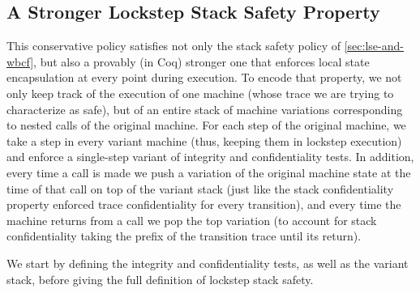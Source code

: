 \documentclass[acmsmall,review,anonymous]{acmart}\settopmatter{printfolios=true,printccs=false,printacmref=false}
\begin{document}
{%


\subsection{A Stronger Lockstep Stack Safety Property}
\label{sec:lockstep}


This conservative policy satisfies not only the stack safety policy of
\cref{sec:lse-and-wbcf},
but also a provably (in Coq) stronger one that enforces local state
encapsulation at every point during execution. To encode that
property, we not only keep track of the execution of one machine
(whose trace we are trying to characterize as safe), but of an entire
stack of machine variations corresponding to nested calls of the
original machine. For each step of the original machine, we take a
step in every variant machine (thus, keeping them in lockstep
execution) and enforce a single-step variant of integrity and
confidentiality tests. In addition, every time a call is made we push
a variation of the original machine state at the time of that call on
top of the variant stack (just like the stack confidentiality property
enforced trace confidentiality for every transition), and every time
the machine returns from a call we pop the top variation (to account
for stack confidentiality taking the prefix of the transition trace
until its return).

We start by defining the integrity and confidentiality tests, as well
as the variant stack, before giving the full definition of lockstep
stack safety.

\newcommand{\vse}{\mathit{vse}}
\newcommand{\VSES}{\mathit{VSE}}
\newcommand{\vs}{\mathit{vs}}
\newcommand{\VSS}{\mathit{VS}}

}
\end{document}
